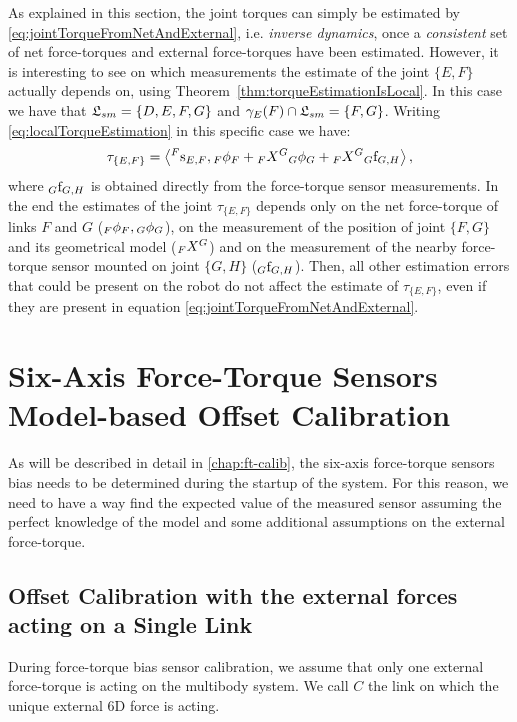 As explained in this section, the joint torques can simply be estimated by \eqref{eq:jointTorqueFromNetAndExternal}, i.e. \emph{inverse dynamics}, once a \emph{consistent} set of net force-torques and external force-torques have been estimated. 
However, it is interesting to see on which measurements the estimate of the joint $\{ E, F\}$ actually depends on, using Theorem~\ref{thm:torqueEstimationIsLocal}. 
In this case we have that $\mathfrak{L}_{sm} = \{ D, E, F, G \}$ and $\gamma_E(F) \cap \mathfrak{L}_{sm} = \{ F, G \}$. Writing \eqref{eq:localTorqueEstimation} in this specific case we have:
\begin{equation}
\label{eq:localTorqueEstimationExample}
\tau_{\{E,F\}} = \left< \hspace{0em}^F \mathrm{s}_{E,F} , \hspace{0em}_F \phi_F +
\hspace{0em}_F X^G \hspace{0em}_G \phi_G + \hspace{0em}_F X^G \hspace{0em}_G {\rm f}_{G,H} \right> ,
\end{equation}
where $\hspace{0em}_G {\rm f}_{G,H}$ is obtained directly from the force-torque sensor measurements. 
In the end the estimates of the joint $\tau_{\{E,F\}}$ depends only on the net force-torque of links $F$ and $G$ ($\hspace{0em}_F \phi_F , \hspace{0em}_G \phi_G$), on the measurement of the position of joint $\{ F, G \}$ and its geometrical model ($\hspace{0em}_F X^G$) and on the measurement of the nearby force-torque sensor mounted on joint $\{G,H\}$ ($\hspace{0em}_G {\rm f}_{G,H}$). Then, all other estimation errors that could be present on the robot do not affect the estimate of $\tau_{\{E,F\}}$, even if they are present in equation \eqref{eq:jointTorqueFromNetAndExternal}. 


\section{Six-Axis Force-Torque Sensors Model-based Offset Calibration} 
\label{sec:model-based-ft-offset-calibration}
As will be described in detail in \ref{chap:ft-calib}, the six-axis force-torque sensors bias needs to be determined during the startup of the system. For this reason, we need to have a way find the expected value of the measured sensor assuming the perfect knowledge of the model and some additional assumptions on the external force-torque. 

\subsection{Offset Calibration with the external forces acting on a Single Link}
\begin{assumption}
\label{ass:ft-calibration-on-single-link}
During force-torque bias sensor calibration, we assume that only one external force-torque is acting on the multibody system. We call $C$ the link on which the unique external 6D force is acting.
\end{assumption}

